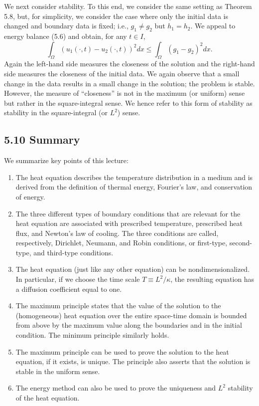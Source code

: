 We next consider stability. To this end, we consider the same setting as Theorem 5.8, but, for simplicity, we consider the case where only the initial data is changed and boundary data is fixed; i.e., $g_1 \neq g_2$ but $h_1 = h_2$. We appeal to energy balance (5.6) and obtain, for any $t \in I$,
\[\int_\Omega (u_1(\cdot, t) - u_2(\cdot, t))^2 dx \leq \int_\Omega (g_1 - g_2)^2 dx.\]
Again the left-hand side measures the closeness of the solution and the right-hand side measures the closeness of the initial data. We again observe that a small change in the data results in a small change in the solution; the problem is stable. However, the measure of ``closeness'' is not in the maximum (or uniform) sense but rather in the square-integral sense. We hence refer to this form of stability as stability in the square-integral (or $L^2$) sense.

\subsection{5.10 Summary}
We summarize key points of this lecture:
\begin{enumerate}
    \item The heat equation describes the temperature distribution in a medium and is derived from the definition of thermal energy, Fourier's law, and conservation of energy.
    \item The three different types of boundary conditions that are relevant for the heat equation are associated with prescribed temperature, prescribed heat flux, and Newton's law of cooling. The three conditions are called, respectively, Dirichlet, Neumann, and Robin conditions, or first-type, second-type, and third-type conditions.
    \item The heat equation (just like any other equation) can be nondimensionalized. In particular, if we choose the time scale $T \equiv L^2/\kappa$, the resulting equation has a diffusion coefficient equal to one.
    \item The maximum principle states that the value of the solution to the (homogeneous) heat equation over the entire space-time domain is bounded from above by the maximum value along the boundaries and in the initial condition. The minimum principle similarly holds.
    \item The maximum principle can be used to prove the solution to the heat equation, if it exists, is unique. The principle also asserts that the solution is stable in the uniform sense.
    \item The energy method can also be used to prove the uniqueness and $L^2$ stability of the heat equation.
\end{enumerate}
